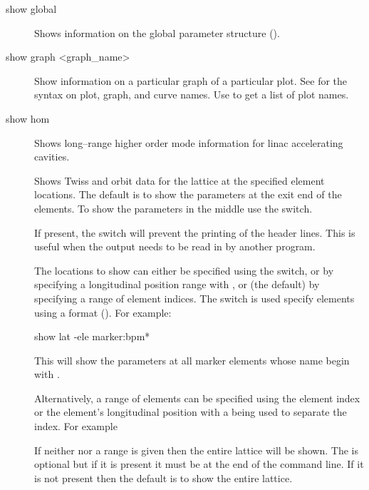 {{{{\begin{description}

  \item[show global] \Newline
Shows information on the global parameter structure ().


  \item[show graph <graph\_name>] \Newline
Show information on a particular graph of a particular plot. See
 for the syntax on plot, graph, and curve names.
Use  to get a list of plot names.


  \item[show hom] \Newline
Shows long--range higher order mode information for linac accelerating
cavities.


  \item[\protect\parbox{6in}{
        show lattice \{-no\_header\} \{-middle\} \{-custom <file\_name>\} \\ 
        \hspace*{2in} \{-s\} \{-elements <name>\} \{<location\_range>\}}] \Newline
Shows Twiss and orbit data for the  lattice at the specified
element locations. The default is to show the parameters at the exit
end of the elements. To show the parameters in the middle use the
 switch.

If present, the  switch will prevent the printing of
the header lines. This is useful when the output needs to be read in
by another program.

The locations to show can either be specified using the 
switch, or by specifying a longitudinal position range with ,
or (the default) by specifying a range of element indices.  The
 switch is used specify elements using a 
format (). For example:
\begin{example}
  show lat -ele marker:bpm*
\end{example}
This will show the parameters at all marker elements whose name begin
with . 

Alternatively, a range of elements can be specified using the element
index or the element's longitudinal position with a  being
used to separate the index. For example
If neither  nor a range is given then the entire lattice
will be shown. The  is optional but if it is present
it must be at the end of the command line.  If it is not present then
the default is to show the entire lattice.


\end{description}}}}}
